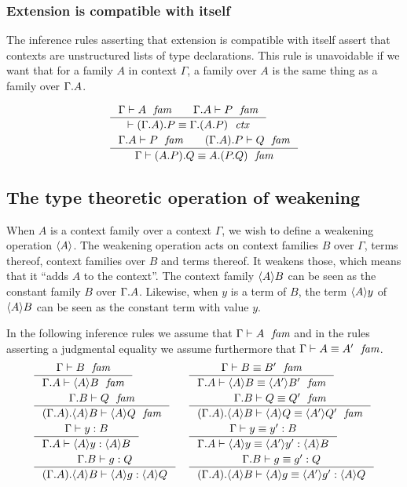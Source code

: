 \subsubsection{Extension is compatible with itself}\label{comp-ee}
The inference rules asserting that extension is compatible with itself assert
that contexts are unstructured lists of type declarations. This rule is
unavoidable if we want that for a family $A$ in context $\Gamma$, a family over
$A$ is the same thing as a family over $\ctxext{\Gamma}{A}$. 

\begin{align}
& \inference{\jfam{\Gamma}{A}\qquad\jfam{{\Gamma}{A}}{P}}
  {\jctxeq{\ctxext{{\Gamma}{A}}{P}}{\ctxext{\Gamma}{{A}{P}}}}\\
& \inference{\jfam{{\Gamma}{A}}{P}\qquad\jfam{{{\Gamma}{A}}{P}}{Q}}
  {\jfameq{\Gamma}{\ctxext{{A}{P}}{Q}}{\ctxext{A}{{P}{Q}}}}
\end{align}

\subsection{The type theoretic operation of weakening}
When $A$ is a context family over a context $\Gamma$, we wish to define a weakening
operation $\ctxwk{A}{}$. The weakening operation acts on context families $B$ 
over $\Gamma$, terms thereof, context families over $B$ and terms thereof.
It weakens those, which means that it ``adds $A$ to the context''. The context
family $\ctxwk{A}{B}$ can be seen as the constant family $B$ over $\ctxext{\Gamma}{A}$.
Likewise, when $y$ is a term of $B$, the term $\ctxwk{A}{y}$ of $\ctxwk{A}{B}$
can be seen as the constant term with value $y$.
 
 In the following inference rules we assume that $\jfam{\Gamma}{A}$ and in the
 rules asserting a judgmental equality we assume furthermore that 
 $\jfameq{\Gamma}{A}{A'}$.
\begin{align}
& \inference{\jfam{\Gamma}{B}}{\jfam{{\Gamma}{A}}{\ctxwk{A}{B}}}
& & \inference{\jfameq{\Gamma}{B}{B'}}{\jfameq{{\Gamma}{A}}{\ctxwk{A}{B}}{\ctxwk{A'}{B'}}}\\
& \inference{\jfam{{\Gamma}{B}}{Q}}
{\jfam{{{\Gamma}{A}}{\ctxwk{A}{B}}}{\ctxwk{A}{Q}}}
& & \inference{\jfameq{{\Gamma}{B}}{Q}{Q'}}
{\jfameq{{{\Gamma}{A}}{\ctxwk{A}{B}}}{\ctxwk{A}{Q}}{\ctxwk{A'}{Q'}}}\\
& \inference{\jterm{\Gamma}{B}{y}}{\jterm{{\Gamma}{A}}{\ctxwk{A}{B}}{\ctxwk{A}{y}}}
& & \inference{\jtermeq{\Gamma}{B}{y}{y'}}{\jtermeq{{\Gamma}{A}}{\ctxwk{A}{B}}{\ctxwk{A}{y}}{\ctxwk{A'}{y'}}}\\
& \inference{\jterm{{\Gamma}{B}}{Q}{g}}{\jterm{{{\Gamma}{A}}{\ctxwk{A}{B}}}{\ctxwk{A}{Q}}{\ctxwk{A}{g}}}
& & \inference{\jtermeq{{\Gamma}{B}}{Q}{g}{g'}}
{\jtermeq{{{\Gamma}{A}}{\ctxwk{A}{B}}}{\ctxwk{A}{Q}}{\ctxwk{A}{g}}{\ctxwk{A'}{g'}}}
\end{align}

